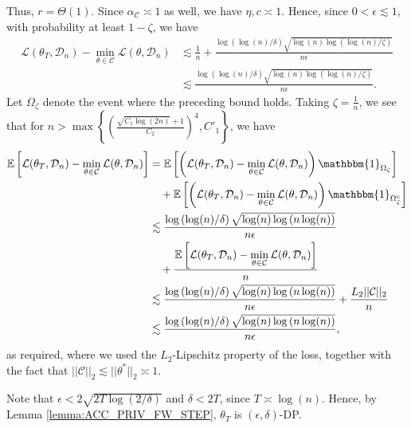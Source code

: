 \documentclass{article}
\begin{document}
Thus, $r = \Theta(1)$. Since $\alpha_{\mathcal{C}} \asymp 1$ as well, we have $\eta, c \asymp 1$. Hence, since $0 < \epsilon \lesssim 1$, with probability at least $1 - \zeta$, we have
\begin{align*}
\mathcal{L}(\theta_T, \mathcal{D}_n) - \mathop{\min}\limits_{\theta \in \mathcal{C}}\mathcal{L}(\theta, \mathcal{D}_n) &\lesssim \frac{1}{n} + \frac{\log\left(\log(n)/\delta\right)\sqrt{\log(n)\log\left(\log(n)/\zeta\right)}}{n\epsilon}\\
&\lesssim \frac{\log\left(\log(n)/\delta\right)\sqrt{\log(n)\log\left(\log(n)/\zeta\right)}}{n\epsilon}.
\end{align*}
Let $\Omega_\zeta$ denote the event where the preceding bound holds. Taking $\zeta = \frac{1}{n}$, we see that for $n > \max\left\{\left(\frac{\sqrt{C_1\log(2n)} + 1}{C_2}\right)^{4}, C'_1\right\}$, we have
\begin{align*}
\mathbb{E}\left[\mathcal{L}(\theta_T, \mathcal{D}_n) - \mathop{\min}\limits_{\theta \in \mathcal{C}}\mathcal{L}(\theta, \mathcal{D}_n)\right] &= \mathbb{E}\left[\left(\mathcal{L}(\theta_T, \mathcal{D}_n) - \mathop{\min}\limits_{\theta \in \mathcal{C}}\mathcal{L}(\theta, \mathcal{D}_n)\right)\mathbbm{1}_{\Omega_\zeta}\right]\\
& \quad + \mathbb{E}\left[\left(\mathcal{L}(\theta_T, \mathcal{D}_n) - \mathop{\min}\limits_{\theta \in \mathcal{C}}\mathcal{L}(\theta, \mathcal{D}_n)\right)\mathbbm{1}_{\Omega^c_\zeta}\right]\\
&\lesssim \frac{\log\left(\log(n)/\delta\right)\sqrt{\log(n)\log\left(n\log(n)\right)}}{n\epsilon}\\
& \quad + \frac{\mathbb{E}\left[\mathcal{L}(\theta_T, \mathcal{D}_n) - \mathop{\min}\limits_{\theta \in \mathcal{C}}\mathcal{L}(\theta, \mathcal{D}_n)\right]}{n}\\
&\lesssim \frac{\log\left(\log(n)/\delta\right)\sqrt{\log(n)\log\left(n\log(n)\right)}}{n\epsilon} + \frac{L_2||\mathcal{C}||_2}{n}\\
&\lesssim \frac{\log\left(\log(n)/\delta\right)\sqrt{\log(n)\log\left(n\log(n)\right)}}{n\epsilon},
\end{align*}
as required, where we used the $L_2$-Lipschitz property of the loss, together with the fact that $||\mathcal{C}||_2 \lesssim ||\theta^*||_2 \asymp 1$.

Note that $\epsilon < 2\sqrt{2T\log(2/\delta)}$ and $\delta < 2T$, since $T \asymp \log(n)$. Hence, by Lemma \ref{lemma:ACC_PRIV_FW_STEP}, $\theta_T$ is $(\epsilon, \delta)$-DP. 
\end{document}
